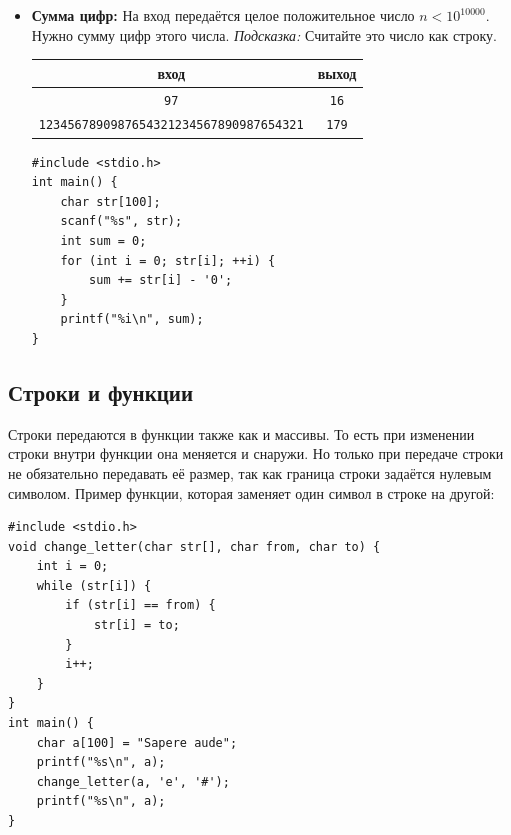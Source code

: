 \documentclass{article}
\begin{document}
\begin{itemize}
\newpage
\item \textbf{Сумма цифр:} На вход передаётся целое положительное число $n < 10^{10000}$. Нужно сумму цифр этого числа.
\textit{Подсказка:} Считайте это число как строку.
\begin{center}
\begin{tabular}{ c | c }
 вход & выход \\ \hline
  \texttt{97} & \texttt{16} \\
  \texttt{1234567890987654321234567890987654321} & \texttt{179} \\
\end{tabular}
\end{center}
\begin{lstlisting}[backgroundcolor = \color{solcolor}]
#include <stdio.h>
int main() {
    char str[100];
    scanf("%s", str);
    int sum = 0;
    for (int i = 0; str[i]; ++i) {
        sum += str[i] - '0';
    }
    printf("%i\n", sum);
}
\end{lstlisting}
\end{itemize}

\newpage
\subsection*{Строки и функции}
Строки передаются в функции также как и массивы. То есть при изменении строки внутри функции она меняется и снаружи. Но только при передаче строки не обязательно передавать её размер, так как граница строки задаётся нулевым символом. Пример функции, которая заменяет один символ в строке на другой:
\begin{lstlisting}
#include <stdio.h>
void change_letter(char str[], char from, char to) {
    int i = 0;
    while (str[i]) {
        if (str[i] == from) {
            str[i] = to;
        }
        i++;
    }
}
int main() {
    char a[100] = "Sapere aude";
    printf("%s\n", a);
    change_letter(a, 'e', '#');
    printf("%s\n", a);
}

\end{lstlisting}
\end{document}

